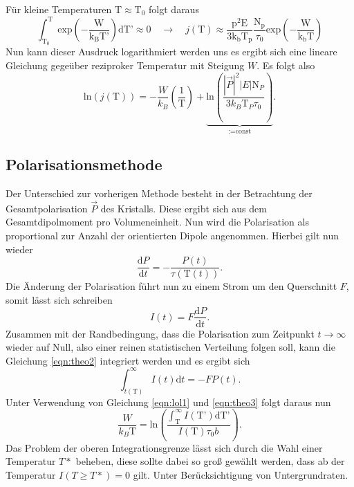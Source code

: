 Für kleine Temperaturen $\text{T} \approx \text{T}_0$ folgt daraus
\begin{equation}
    \label{eqn:theo5}
    \int^{\text{T}}_{\text{T}_0}  \text{exp} \left( - \frac{\text{W}}{\text{k}_{\text{B}}\text{T'}} \right) \text{dT'} \approx 0 \quad \to \quad j \left( \text{T} \right) \approx \frac{\text{p}^2 \text{E}}{3\text{k}_{\text{b}}\text{T}_{\text{p}}} \frac{\text{N}_{\text{p}}}{\tau_0} \text{exp} \left(-\frac{\text{W}}{\text{k}_{\text{b}}\text{T}} \right)
\end{equation}
Nun kann dieser Ausdruck logarithmiert werden uns es ergibt sich eine lineare Gleichung gegeüber reziproker Temperatur mit Steigung $W$. Es folgt also
\begin{equation}
    \label{eqn:theo6}
\text{ln}(j(\text{T})) = - \frac{W}{k_{B}} \left( \frac{1}{\text{T}}\right) + \underbrace{\text{ln}\left( \frac{|\vec{P}|^2 |E| \text{N}_P}{3 k_B \text{T}_P \tau_0}\right)}_{:= \text{const}}.
\end{equation}

\subsection{Polarisationsmethode}
\label{sec:pola}
Der Unterschied zur vorherigen Methode besteht in der Betrachtung der Gesamtpolarisation $\vec{P}$ des Kristalls. Diese ergibt sich aus dem Gesamtdipolmoment pro Volumeneinheit. Nun wird die Polarisation als 
proportional zur Anzahl der orientierten Dipole angenommen. Hierbei gilt nun wieder
\begin{equation}
    \label{eqn:theo3}
\frac{\text{d}P}{\text{d}t} = - \frac{P(t)}{\tau(\text{T}(t))}.
\end{equation}
Die Änderung der Polarisation führt nun zu einem Strom um den Querschnitt $F$, somit lässt sich schreiben
\begin{equation}
    \label{eqn:theo2}
I(t) = F \frac{\text{d}P}{\text{d}t}.
\end{equation}
Zusammen mit der Randbedingung, dass die Polarisation zum Zeitpunkt $t \to \infty$ wieder auf Null, also einer reinen statistischen Verteilung folgen soll, kann die Gleichung 
\eqref{eqn:theo2} integriert werden und es ergibt sich
\begin{equation}
\int_{t(\text{T})}^{\infty} I(t) \text{d}t = - F P(t).
\end{equation}
Unter Verwendung von Gleichung \eqref{eqn:lol1} und \eqref{eqn:theo3} folgt daraus nun
\begin{equation}
    \label{eqn:idkwhat}
\frac{W}{k_B \text{T}} = \text{ln} \left( \frac{\int_{\text{T}}^{\infty} I(\text{T'}) \text{dT'} }{I(\text{T}) \tau_0 b}\right).
\end{equation}
Das Problem der oberen Integrationsgrenze lässt sich durch die Wahl einer Temperatur $T*$ beheben, diese sollte dabei so groß gewählt werden, dass ab der Temperatur $I(T \geq T*) = 0$ gilt. Unter 
Berücksichtigung von Untergrundraten.

